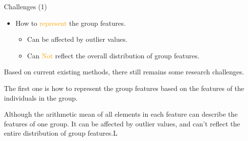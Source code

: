 \documentclass[
 size=14pt,
 paper=smartboard,  %
 mode=present, 		%
 display=slides, 	%
 style=tuliplab,  	%
 pauseslide,
 fleqn,leqno]{powerdot}
\begin{document}
\begin{slide}{Challenges (1)}
\begin{itemize}
\item
How to \textcolor{orange}{represent} the group features.

\begin{itemize}
\item
Can be affected by outlier values.

\item
Can \textcolor{orange}{Not} reflect the overall distribution of group features.
\end{itemize}
\end{itemize}

\begin{note}
Based on current existing methods,
there still remains some research challenges.

The first one is how to represent the group features
based on the features of the individuals in the group.

Although the arithmetic mean of all elements
in each feature can describe the features of one group.
It can be affected by outlier values,
and can't reflect the entire distribution of group features.L
\end{note}

\end{slide}
\end{document}
